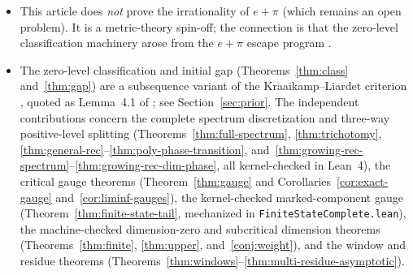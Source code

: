 \documentclass[11pt]{article}
\theoremstyle{definition}
\theoremstyle{remark}
\begin{document}
\begin{itemize}[leftmargin=1.5em]
\texttt{AuditResidueMultiAsymptotic.lean}, base axioms only, zero \texttt{sorryAx},
log \texttt{verification/\allowbreak audit\_\allowbreak residue\_\allowbreak multi\_\allowbreak asymptotic\_\allowbreak 20261123.log})
and numerically corroborated by
\texttt{verify\_\allowbreak residue\_\allowbreak multi\_\allowbreak asymptotic.py}.
\item This article does \emph{not} prove the irrationality of $e+\pi$ (which
remains an open problem). It is a metric-theory spin-off; the connection is
that the zero-level classification machinery arose from the $e+\pi$ escape
program \cite{Phase1}.
\item The zero-level classification and initial gap (Theorems~\ref{thm:class}
and~\ref{thm:gap}) are a subsequence variant of the Kraaikamp--Liardet
criterion \cite{KL}, quoted as Lemma~4.1 of \cite{BDS}; see
Section~\ref{sec:prior}. The independent contributions concern the complete
spectrum discretization and three-way positive-level splitting
(Theorems~\ref{thm:full-spectrum}, \ref{thm:trichotomy},
\ref{thm:general-rec}--\ref{thm:poly-phase-transition},
and~\ref{thm:growing-rec-spectrum}--\ref{thm:growing-rec-dim-phase}, all kernel-checked
in Lean~4), the critical gauge theorems
(Theorem~\ref{thm:gauge} and Corollaries~\ref{cor:exact-gauge}
and~\ref{cor:liminf-gauges}), the kernel-checked marked-component gauge
(Theorem~\ref{thm:finite-state-tail}, mechanized in
\texttt{Finite\allowbreak State\allowbreak Complete.lean}), the machine-checked
dimension-zero and subcritical dimension theorems
(Theorems~\ref{thm:finite}, \ref{thm:upper}, and~\ref{conj:weight}), and the
window and residue theorems (Theorems~\ref{thm:windows}--\ref{thm:multi-residue-asymptotic}).
\end{itemize}
\end{document}
